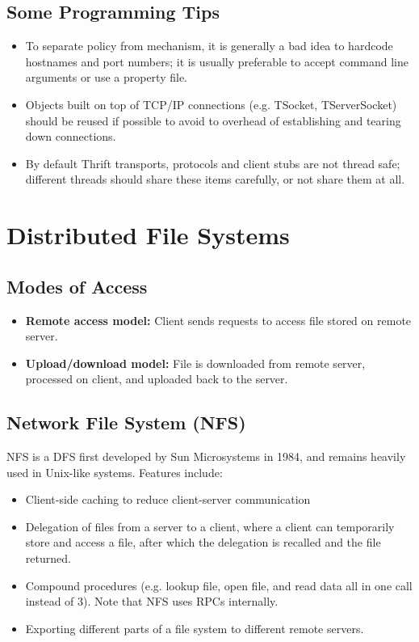 \documentclass[12pt,titlepage]{article}
\let\stdsection\section
\renewcommand\section{\clearpage\stdsection}
\begin{document}
    \subsection{Some Programming Tips}
      \begin{itemize}
        \item To separate policy from mechanism, it is generally a bad idea to hardcode hostnames and port numbers; it is usually preferable to accept command line
        arguments or use a property file.
        \item Objects built on top of TCP/IP connections (e.g. TSocket, TServerSocket) should be reused if possible to avoid to overhead of establishing and tearing
        down connections.
        \item By default Thrift transports, protocols and client stubs are not thread safe; different threads should share these items carefully, or not share them
        at all.
      \end{itemize}
      

  \section{Distributed File Systems}

    \subsection{Modes of Access}
      \begin{itemize}
        \item \textbf{Remote access model:} Client sends requests to access file stored on remote server.
        \item \textbf{Upload/download model:} File is downloaded from remote server, processed on client, and uploaded back to the server.
      \end{itemize}

    \subsection{Network File System (NFS)}
      NFS is a DFS first developed by Sun Microsystems in 1984, and remains heavily used in Unix-like systems. Features include:
      \begin{itemize}
        \item Client-side caching to reduce client-server communication
        \item Delegation of files from a server to a client, where a client can temporarily store and access a file, after which the delegation is recalled and
        the file returned.
        \item Compound procedures (e.g. lookup file, open file, and read data all in one call instead of 3). Note that NFS uses RPCs internally.
        \item Exporting different parts of a file system to different remote servers.
      \end{itemize}
\end{document}
